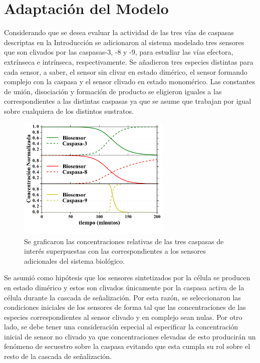 \section{Adaptación del Modelo}

Considerando que se desea evaluar la actividad de las tres vías de caspasas descriptas en la Introducción se adicionaron al sistema modelado tres sensores que son clivados por las caspasas-3, -8 y -9, para estudiar las vías efectora, extrínseca e intrínseca, respectivamente. Se añadieron tres especies distintas para cada sensor, a saber, el sensor sin clivar en estado dimérico, el sensor formando complejo con la caspasa y el sensor clivado en estado monomérico. Las constantes de unión, disociación y formación de producto se eligieron iguales a las correspondientes a las distintas caspasas ya que se asume que trabajan por igual sobre cualquiera de los distintos sustratos.

\begin{figure}
    \centering
    \includegraphics[width=0.65\textwidth]{./img/Cap3/AdicSensores.png}
    \caption{Se graficaron las concentraciones relativas de las tres caspasas de interés superpuestas con las correspondientes a los sensores adicionales del sistema biológico.}
    \label{fig:AdicSensores}
\end{figure}

Se asumió como hipótesis que los sensores sintetizados por la célula se producen en estado dimérico y estos son clivados únicamente por la caspasa activa de la célula durante la cascada de señalización. Por esta razón, se seleccionaron las condiciones iniciales de los sensores de forma tal que las concentraciones de las especies correspondientes al sensor clivado y en complejo sean nulas. Por otro lado, se debe tener una consideración especial al especificar la concentración inicial de sensor no clivado ya que concentraciones elevadas de esto producirán un fenómeno de secuestro sobre la caspasa evitando que esta cumpla su rol sobre el resto de la cascada de señalización.


